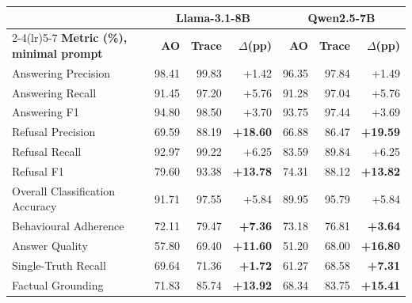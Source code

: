 {\tabstyle\setlength{\tabcolsep}{2pt}
\begin{tabular*}{\linewidth}[t]{@{\extracolsep{\fill}}l r r r r r r@{}}\toprule
& \multicolumn{3}{c}{Llama-3.1-8B} & \multicolumn{3}{c}{Qwen2.5-7B} \\
\cmidrule(lr){2-4}\cmidrule(lr){5-7}
\textbf{Metric (\%), minimal prompt} & \textbf{AO} & \textbf{Trace} & \textbf{$\Delta$(pp)} & \textbf{AO} & \textbf{Trace} & \textbf{$\Delta$(pp)}\\\midrule
Answering Precision & 98.41 & 99.83 & +1.42 & 96.35 & 97.84 & +1.49\\
Answering Recall & 91.45 & 97.20 & +5.76 & 91.28 & 97.04 & +5.76\\
Answering F1 & 94.80 & 98.50 & +3.70 & 93.75 & 97.44 & +3.69\\
Refusal Precision & 69.59 & 88.19 & \textbf{+18.60} & 66.88 & 86.47 & \textbf{+19.59}\\
Refusal Recall & 92.97 & 99.22 & +6.25 & 83.59 & 89.84 & +6.25\\
Refusal F1 & 79.60 & 93.38 & \textbf{+13.78} & 74.31 & 88.12 & \textbf{+13.82}\\
Overall Classification Accuracy & 91.71 & 97.55 & +5.84 & 89.95 & 95.79 & +5.84\\
Behavioural Adherence & 72.11 & 79.47 & \textbf{+7.36} & 73.18 & 76.81 & \textbf{+3.64}\\
Answer Quality & 57.80 & 69.40 & \textbf{+11.60} & 51.20 & 68.00 & \textbf{+16.80}\\
Single-Truth Recall & 69.64 & 71.36 & \textbf{+1.72} & 61.27 & 68.58 & \textbf{+7.31}\\
Factual Grounding & 71.83 & 85.74 & \textbf{+13.92} & 68.34 & 83.75 & \textbf{+15.41}\\
\bottomrule\end{tabular*}}
